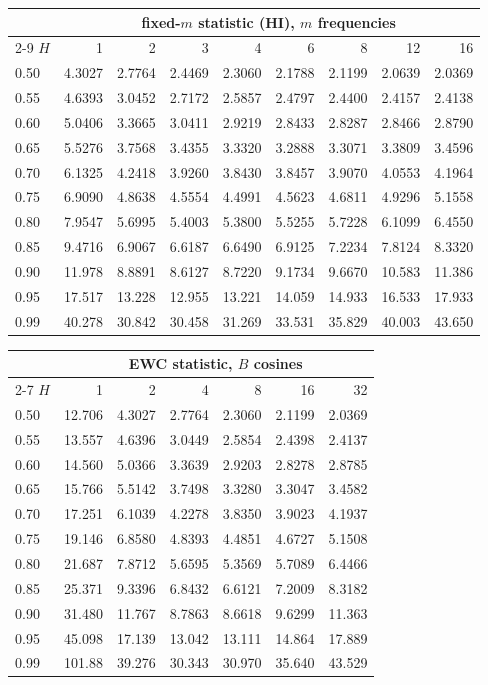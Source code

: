 \begin{tabular}{@{}lrrrrrrrr@{}}\toprule
 & \multicolumn{8}{c}{fixed-$m$ statistic (HI), $m$ frequencies}\\\cmidrule(l){2-9}
$H$ & 1 & 2 & 3 & 4 & 6 & 8 & 12 & 16\\\midrule
0.50 & 4.3027 & 2.7764 & 2.4469 & 2.3060 & 2.1788 & 2.1199 & 2.0639 & 2.0369\\
0.55 & 4.6393 & 3.0452 & 2.7172 & 2.5857 & 2.4797 & 2.4400 & 2.4157 & 2.4138\\
0.60 & 5.0406 & 3.3665 & 3.0411 & 2.9219 & 2.8433 & 2.8287 & 2.8466 & 2.8790\\
0.65 & 5.5276 & 3.7568 & 3.4355 & 3.3320 & 3.2888 & 3.3071 & 3.3809 & 3.4596\\
0.70 & 6.1325 & 4.2418 & 3.9260 & 3.8430 & 3.8457 & 3.9070 & 4.0553 & 4.1964\\
0.75 & 6.9090 & 4.8638 & 4.5554 & 4.4991 & 4.5623 & 4.6811 & 4.9296 & 5.1558\\
0.80 & 7.9547 & 5.6995 & 5.4003 & 5.3800 & 5.5255 & 5.7228 & 6.1099 & 6.4550\\
0.85 & 9.4716 & 6.9067 & 6.6187 & 6.6490 & 6.9125 & 7.2234 & 7.8124 & 8.3320\\
0.90 & 11.978 & 8.8891 & 8.6127 & 8.7220 & 9.1734 & 9.6670 & 10.583 & 11.386\\
0.95 & 17.517 & 13.228 & 12.955 & 13.221 & 14.059 & 14.933 & 16.533 & 17.933\\
0.99 & 40.278 & 30.842 & 30.458 & 31.269 & 33.531 & 35.829 & 40.003 & 43.650\\
\bottomrule\end{tabular}
\par\medskip
\begin{tabular}{@{}lrrrrrr@{}}\toprule
 & \multicolumn{6}{c}{EWC statistic, $B$ cosines}\\\cmidrule(l){2-7}
$H$ & 1 & 2 & 4 & 8 & 16 & 32\\\midrule
0.50 & 12.706 & 4.3027 & 2.7764 & 2.3060 & 2.1199 & 2.0369\\
0.55 & 13.557 & 4.6396 & 3.0449 & 2.5854 & 2.4398 & 2.4137\\
0.60 & 14.560 & 5.0366 & 3.3639 & 2.9203 & 2.8278 & 2.8785\\
0.65 & 15.766 & 5.5142 & 3.7498 & 3.3280 & 3.3047 & 3.4582\\
0.70 & 17.251 & 6.1039 & 4.2278 & 3.8350 & 3.9023 & 4.1937\\
0.75 & 19.146 & 6.8580 & 4.8393 & 4.4851 & 4.6727 & 5.1508\\
0.80 & 21.687 & 7.8712 & 5.6595 & 5.3569 & 5.7089 & 6.4466\\
0.85 & 25.371 & 9.3396 & 6.8432 & 6.6121 & 7.2009 & 8.3182\\
0.90 & 31.480 & 11.767 & 8.7863 & 8.6618 & 9.6299 & 11.363\\
0.95 & 45.098 & 17.139 & 13.042 & 13.111 & 14.864 & 17.889\\
0.99 & 101.88 & 39.276 & 30.343 & 30.970 & 35.640 & 43.529\\
\bottomrule\end{tabular}
